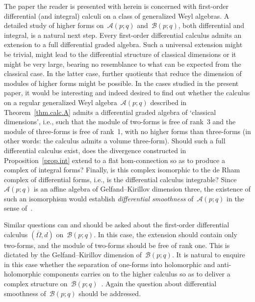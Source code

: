 \documentclass[pdftex]{sigma}
\numberwithin{equation}{section}
\def\Weyl#1#2{{\mathcal{B}}(#1;#2)}
\def\AWeyl#1#2{{\mathcal{A}}(#1;#2)}
\begin{document}
The paper the reader is presented with herein is concerned with f\/irst-order dif\/ferential (and integral) calculi on a class of generalized Weyl algebras. A detailed study of higher forms on~$\AWeyl p q$ and~$\Weyl p q$, both dif\/ferential and integral, is a natural next step. Every f\/irst-order dif\/ferential calculus admits an extension to a full dif\/ferential graded algebra. Such a universal extension might be trivial, might lead to the dif\/ferential structure of classical dimensions or it might be very large, bearing no resemblance to what can be expected from the classical case. In the latter case, further quotients that reduce the dimension of modules of higher forms might be possible. In the cases studied in the present paper, it would be interesting and indeed desired to f\/ind out whether the calculus on a regular generalized Weyl algebra~$\AWeyl p q$ described in Theorem~\ref{thm.calc.A} admits a dif\/ferential graded algebra of `classical dimensions', i.e., such that the module of two-forms is free of rank~3 and the module of three-forms is free of rank~1, with no higher forms than three-forms (in other words: the calculus admits a volume three-form). Should such a full dif\/ferential calculus exist, does the divergence constructed in Proposition~\ref{prop.int} extend to a f\/lat hom-connection so as to produce a complex of integral forms? Finally, is this complex isomorphic to the de Rham complex of dif\/ferential forms, i.e., is the dif\/ferential calculus integrable? Since~$\AWeyl p q$ is an af\/f\/ine algebra of Gelfand--Kirillov dimension three, the existence of such an isomorphism would establish {\em differential smoothness} of~$\AWeyl p q$ in the sense of~\cite{BrzSit:smo}.

Similar questions can and should be asked about the f\/irst-order dif\/ferential calculus $(\bar{\Omega}, d)$ on~$\Weyl p q$. In this case, the extension should contain only two-forms, and the module of two-forms should be free of rank one. This is dictated by the Gelfand--Kirillov dimension of~$\Weyl p q$. It is natural to enquire in this case whether the separation of one-forms into holomorphic and anti-holomorphic components carries on to the higher calculus so as to deliver a complex structure on~$\Weyl p q$~\cite{BegSmi:com,KhaLan:hol}. Again the question about dif\/ferential smoothness of~$\Weyl p q$ should be addressed.
\end{document}
